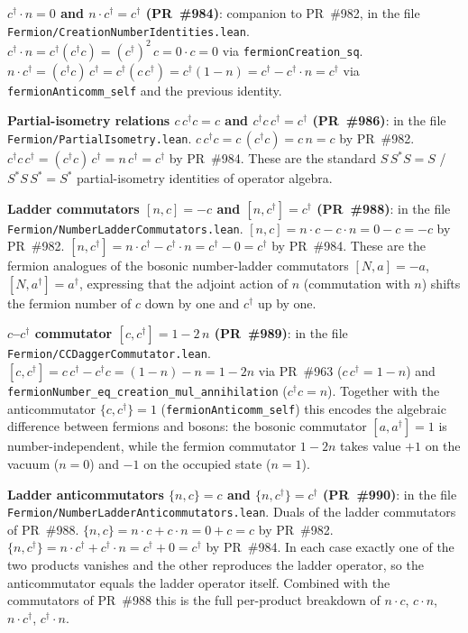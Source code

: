 \documentclass[a4paper,11pt]{article}
\begin{document}
\textbf{$c^\dagger\cdot n = 0$ and $n\cdot c^\dagger = c^\dagger$
(PR~\#984)}: companion to PR~\#982, in the file
\texttt{Fermion/CreationNumberIdentities.lean}.
$c^\dagger\cdot n = c^\dagger(c^\dagger c) = (c^\dagger)^2\,c
 = 0\cdot c = 0$
via \texttt{fermionCreation\_sq}.
$n\cdot c^\dagger = (c^\dagger c)\,c^\dagger = c^\dagger(c\,c^\dagger)
 = c^\dagger(1-n) = c^\dagger - c^\dagger\cdot n = c^\dagger$
via \texttt{fermionAnticomm\_self} and the previous identity.

\textbf{Partial-isometry relations $c\,c^\dagger c = c$ and
$c^\dagger c\,c^\dagger = c^\dagger$ (PR~\#986)}: in the file
\texttt{Fermion/PartialIsometry.lean}.
$c\,c^\dagger c = c\,(c^\dagger c) = c\,n = c$ by PR~\#982.
$c^\dagger c\,c^\dagger = (c^\dagger c)\,c^\dagger = n\,c^\dagger = c^\dagger$
by PR~\#984. These are the standard $S\,S^*S = S$ /
$S^*S\,S^* = S^*$ partial-isometry identities of operator algebra.

\textbf{Ladder commutators $[n,c] = -c$ and $[n,c^\dagger] = c^\dagger$
(PR~\#988)}: in the file
\texttt{Fermion/NumberLadderCommutators.lean}.
$[n,c] = n\cdot c - c\cdot n = 0 - c = -c$ by PR~\#982.
$[n,c^\dagger] = n\cdot c^\dagger - c^\dagger\cdot n = c^\dagger - 0
= c^\dagger$ by PR~\#984. These are the fermion analogues of the
bosonic number-ladder commutators $[N,a] = -a$, $[N,a^\dagger] = a^\dagger$,
expressing that the adjoint action of $n$ (commutation with $n$)
shifts the fermion number of $c$ down by one and $c^\dagger$ up by one.

\textbf{$c$--$c^\dagger$ commutator $[c, c^\dagger] = 1 - 2\,n$
(PR~\#989)}: in the file
\texttt{Fermion/CCDaggerCommutator.lean}.
$[c, c^\dagger] = c\,c^\dagger - c^\dagger c = (1 - n) - n = 1 - 2n$
via PR~\#963 ($c\,c^\dagger = 1 - n$) and
\texttt{fermionNumber\_eq\_creation\_mul\_annihilation}
($c^\dagger c = n$). Together with the anticommutator
$\{c, c^\dagger\} = 1$ (\texttt{fermionAnticomm\_self}) this encodes
the algebraic difference between fermions and bosons: the bosonic
commutator $[a, a^\dagger] = 1$ is number-independent, while the
fermion commutator $1 - 2n$ takes value $+1$ on the vacuum
($n = 0$) and $-1$ on the occupied state ($n = 1$).

\textbf{Ladder anticommutators $\{n,c\} = c$ and $\{n,c^\dagger\} =
c^\dagger$ (PR~\#990)}: in the file
\texttt{Fermion/NumberLadderAnticommutators.lean}. Duals of the
ladder commutators of PR~\#988.
$\{n,c\} = n\cdot c + c\cdot n = 0 + c = c$ by PR~\#982.
$\{n,c^\dagger\} = n\cdot c^\dagger + c^\dagger\cdot n = c^\dagger
+ 0 = c^\dagger$ by PR~\#984. In each case exactly one of the
two products vanishes and the other reproduces the ladder
operator, so the anticommutator equals the ladder operator
itself. Combined with the commutators of PR~\#988 this is the
full per-product breakdown of $n\cdot c$, $c\cdot n$,
$n\cdot c^\dagger$, $c^\dagger\cdot n$.
\end{document}
